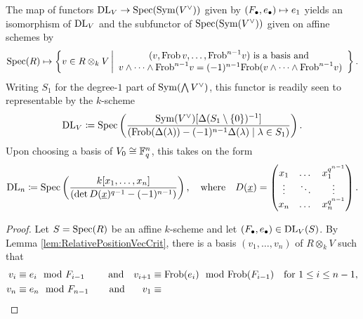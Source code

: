 \documentclass[../main.tex]{subfiles}
\begin{document}
\begin{prop}\label{prop:prop_YwExplicitely}
  The map of functors $\mathrm{DL}_V \to \operatorname{Spec}(\operatorname{Sym}(V^\vee))$ given by 
  $(F_\bullet, e_\bullet) \mapsto e_1$ 
  yields an isomorphism of $\mathrm{DL}_V$ and the subfunctor of $\operatorname{Spec}(\operatorname{Sym}(V^\vee))$ given on
  affine schemes by
  \begin{equation*}
    \spec(R) \mapsto \left\{v \in R \otimes_k V \, \bigg \vert
      \begin{array}c 
        (v, \Frob\, v, \dots, \Frob^{n-1} v) \text{ is a basis and } \\ 
        v \wedge \dots \wedge \Frob^{n-1} v = (-1)^{n-1} \Frob( v \wedge \dots
        \wedge \Frob^{n-1}v) 
      \end{array}\right\}.
  \end{equation*}
  Writing $S_1$ for the degree-$1$ part of $\operatorname{Sym}(\bigwedge V^\vee)$,
  this functor is readily seen to representable by the $k$-scheme
  \begin{equation*}
    \mathrm{DL}_V \coloneq \operatorname{Spec} \left( \frac{\operatorname{Sym}(V^\vee)[\Delta(S_1 \setminus\{0\})^{-1}]}
    {(\mathrm{Frob} (\Delta(\lambda)) - (-1)^{n-1} \Delta(\lambda) \mid \lambda \in S_1)} \right).
  \end{equation*}
  Upon choosing a basis of $V_0 \cong \mathbb{F}_q^n$, this takes on the form
  \begin{equation*}
    \mathrm{DL}_n \coloneq \operatorname{Spec} \left(\frac{k[x_1, \dots, x_n]}{\left(
        \det D(\underline x)^{q-1} - (-1)^{n-1}\right)} \right), \quad
        \text{where} \quad D(\underline x) = 
          \begin{pmatrix}
            x_1 & \dots & x_1^{q^{n-1}}\\
            \vdots & \ddots  & \vdots \\
            x_n & \dots & x_n^{q^{n-1}}
          \end{pmatrix}.
  \end{equation*}
\begin{proof}
  Let $S = \operatorname{Spec}(R)$ be an affine $k$-scheme and let $(F_\bullet, e_\bullet) \in \mathrm{DL}_V(S)$. 
  By Lemma \ref{lem:RelativePositionVecCrit}, there is a basis 
  $(v_1, \dots, v_n)$ of $R \otimes_k V$ such that 
  \begin{equation}\label{eq:conditionsonvecs}
    \begin{aligned}
      v_i &\equiv e_i \mod F_{i-1} \quad &\text{and} \quad v_{i+1} &\equiv
      \Frob(e_i) \mod \Frob(F_{i-1}) \quad \text{for } 1 \leq i \leq n-1,\\ 
      v_n &\equiv e_n \mod F_{n-1} \quad &\text{and}\hspace{0.8em}\quad  v_1 &\equiv

\end{aligned}
\end{equation}
\end{proof}
\end{prop}
\end{document}

